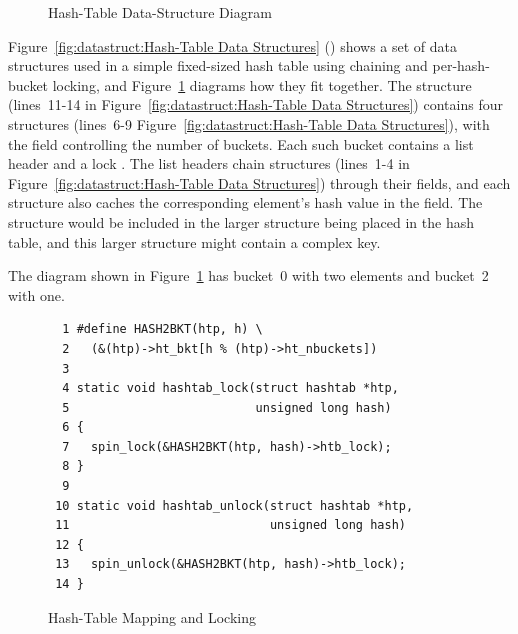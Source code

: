 \begin{figure}[tb]
\begin{center}
\end{center}
\caption{Hash-Table Data-Structure Diagram}
\label{fig:datastruct:Hash-Table Data-Structure Diagram}
\end{figure}

Figure~\ref{fig:datastruct:Hash-Table Data Structures}
()
shows a set of data structures used in a simple fixed-sized hash
table using chaining and per-hash-bucket locking, and
Figure~\ref{fig:datastruct:Hash-Table Data-Structure Diagram}
diagrams how they fit together.
The  structure (lines~11-14 in
Figure~\ref{fig:datastruct:Hash-Table Data Structures})
contains four  structures (lines~6-9
Figure~\ref{fig:datastruct:Hash-Table Data Structures}),
with the  field controlling the number of buckets.
Each such bucket contains a list header  and
a lock .
The list headers chain  structures
(lines~1-4 in
Figure~\ref{fig:datastruct:Hash-Table Data Structures})
through their
 fields, and each  structure also caches
the corresponding element's hash value in the  field.
The  structure would be included in the larger structure
being placed in the hash table, and this larger structure might contain
a complex key.

The diagram shown in
Figure~\ref{fig:datastruct:Hash-Table Data-Structure Diagram}
has bucket~0 with two elements and bucket~2 with one.

\begin{figure}[tb]
{ \scriptsize
\begin{verbatim}
  1 #define HASH2BKT(htp, h) \
  2   (&(htp)->ht_bkt[h % (htp)->ht_nbuckets])
  3 
  4 static void hashtab_lock(struct hashtab *htp,
  5                          unsigned long hash)
  6 {
  7   spin_lock(&HASH2BKT(htp, hash)->htb_lock);
  8 }
  9 
 10 static void hashtab_unlock(struct hashtab *htp,
 11                            unsigned long hash)
 12 {
 13   spin_unlock(&HASH2BKT(htp, hash)->htb_lock);
 14 }
\end{verbatim}
}
\caption{Hash-Table Mapping and Locking}
\label{fig:datastruct:Hash-Table Mapping and Locking}
\end{figure}

